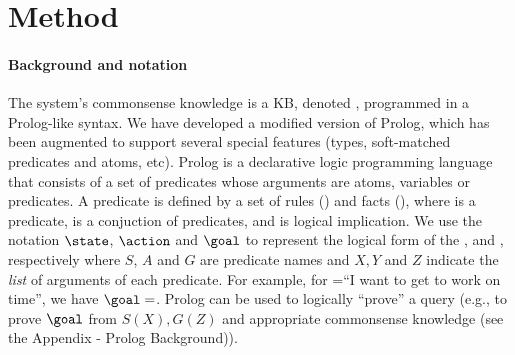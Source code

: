 \section{Method}
\label{sec:method}
\paragraph{Background and notation}
The system's commonsense knowledge is a KB, denoted \KB, programmed in a Prolog-like syntax.
We have developed a modified version of Prolog, which has been augmented to support several special features (types, soft-matched predicates and atoms, etc). %
% 
Prolog \cite{colmerauer1990introduction} is a declarative logic programming language that consists of a set of predicates whose arguments are atoms, variables or predicates. A predicate is defined by a set of rules () and facts (), where  is a predicate,  is a conjuction of predicates, and \prologTerm{$\coloneq$} is logical implication. We use the notation $\state$, $\action$ and $\goal$ to represent the logical form of the \textState, \textAction and \textGoal, respectively where $S$, $A$ and $G$ are predicate names and $X, Y$ and $Z$ indicate the \emph{list} of arguments of each predicate. For example, for \textGoal=``I want to get to work on time'', we have $\goal=$. Prolog can be used to logically ``prove'' a query (e.g., to prove $\goal$ from $S(X), G(Z)$ and appropriate commonsense knowledge (see the Appendix - Prolog Background)).

